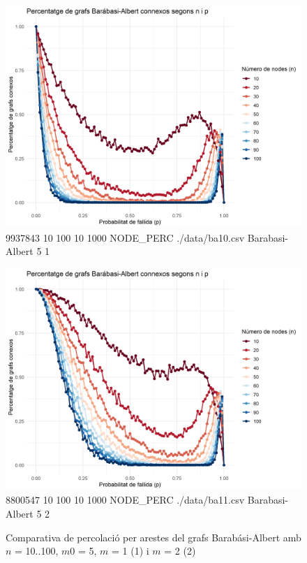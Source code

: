 \documentclass[a4paper]{article}
\begin{document}
	\begin{figure}[h]
		\centering
		\begin{minipage}{0.45\textwidth}
			\centering
			\includegraphics[width=\textwidth]{images/barabasi_10-100_5_1}
			\footnotesize{9937843 10 100 10 1000 NODE\_PERC ./data/ba10.csv Barabasi-Albert 5 1}
		\end{minipage}
		\hfill
		\begin{minipage}{0.45\textwidth}
			\centering
			\includegraphics[width=\textwidth]{images/barabasi_10-100_5_2}
			\footnotesize{8800547 10 100 10 1000 NODE\_PERC ./data/ba11.csv Barabasi-Albert 5 2}
		\end{minipage}
		\caption{Comparativa de percolació per arestes del grafs Barabási-Albert amb $n$ = 10..100, $m0$ = 5, $m$ = 1 (1) i $m$ = 2 (2)}
		\label{fig:percolation_nodes_ba_5_x}
	\end{figure}
\end{document}
